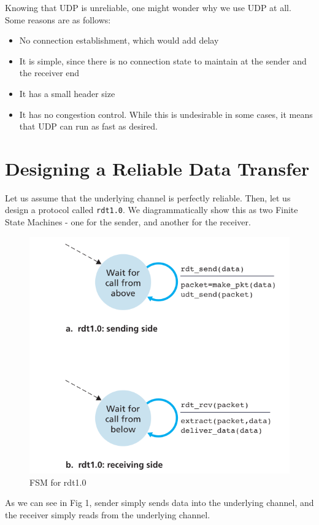 \documentclass[12pt,letterpaper]{amsbook}
\theoremstyle{definition}
\begin{document}
Knowing that UDP is unreliable, one might wonder why we use UDP at all. Some reasons are as follows:
\begin{itemize}
  \item No connection establishment, which would add delay
  \item It is simple, since there is no connection state to maintain at the sender and the receiver end
  \item It has a small header size
  \item It has no congestion control. While this is undesirable in some cases, it means that UDP can run as fast as desired.
\end{itemize}

\section{Designing a Reliable Data Transfer}

Let us assume that the underlying channel is perfectly reliable. Then, let us design a protocol called \texttt{rdt1.0}. We diagrammatically show this as two Finite State Machines - one for the sender, and another for the receiver.

\begin{figure}[htpb]
  \centering
  \includegraphics[width=0.8\linewidth]{./assets/rdt1_fsm.png}
  \caption{FSM for rdt1.0}%
  \label{fig:}
\end{figure}

As we can see in Fig 1, sender simply sends data into the underlying channel, and the receiver simply reads from the underlying channel.
\end{document}
